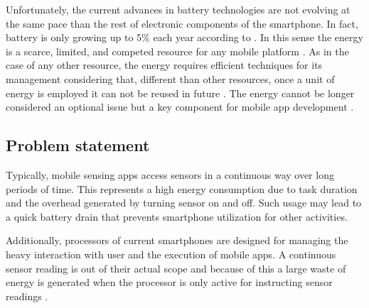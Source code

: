    


Unfortunately, the current advances in battery technologies are not evolving at the same pace than the rest of electronic components \cite{Yurur2014} of the smartphone. In fact, battery is only growing up to 5\% each year according to \cite{Ma2012}.
In this sense the energy is a scarce, limited, and competed resource for any mobile platform \cite{Perez-Torres2012}.
As in the case of any other resource, the energy requires efficient techniques for its management considering that, different than other resources, once a unit of energy is employed it can not be reused in future \cite{Vallina-Rodriguez2013}.
The energy cannot be longer considered an optional issue but a key component for mobile app development \cite{Man2014}.

\subsection{Problem statement} 
\label{sub:problem_statement}
Typically, mobile sensing apps access sensors in a continuous way over long periods of time.
This represents a high energy consumption due to task duration and the overhead generated by turning sensor on and off. Such usage may lead to a quick battery drain that prevents smartphone utilization for other activities.

Additionally, processors of current smartphones are designed for managing the heavy interaction with user and the execution of mobile apps.
A continuous sensor reading is out of their actual scope and because of this a large waste of energy is generated when the processor is only active for instructing sensor readings \cite{Priyantha2011}.


